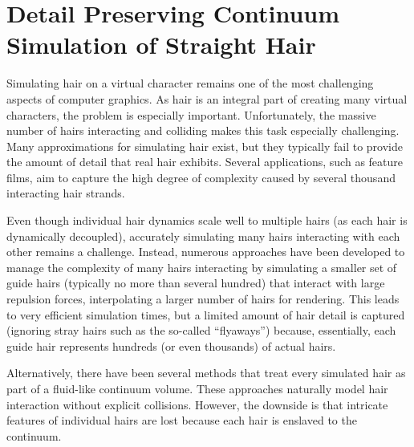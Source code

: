 
\chapter{Detail Preserving Continuum Simulation of Straight
  Hair}\label{chap:hair}

Simulating hair on a virtual character remains one of the most
challenging aspects of computer graphics. As hair is an integral
part of creating many virtual characters, the problem is especially important.
Unfortunately, the massive number of hairs interacting and colliding
makes this task especially challenging. Many approximations for
simulating hair exist, but they typically fail to provide the amount of
detail that real hair exhibits. Several applications, such as feature
films, aim to capture the high degree of complexity caused by several 
thousand interacting hair strands.


Even though individual hair dynamics scale well to multiple hairs (as each hair
is dynamically decoupled), accurately simulating many hairs interacting with
each other remains a challenge.  Instead, numerous approaches have been
developed to manage the complexity of many hairs interacting by simulating a
smaller set of guide hairs (typically no more than several hundred) that
interact with large repulsion forces, interpolating a larger number of hairs for
rendering. This leads to very efficient simulation times, but a limited amount
of hair detail is captured (ignoring stray hairs such as the
so-called ``flyaways'') because, essentially, each guide hair represents
hundreds (or even thousands) of actual hairs.

Alternatively, there have been several methods that treat every simulated hair
as part of a fluid-like continuum volume. These approaches naturally model hair
interaction without explicit collisions. However, the downside is that intricate
features of individual hairs are lost because each hair is enslaved to the
continuum.


